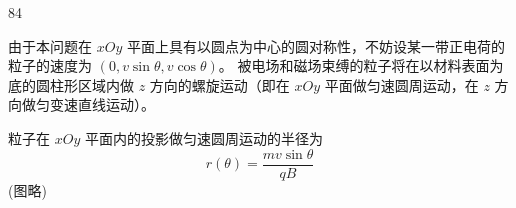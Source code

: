 \begin{solution}{84}
    \begin{subsolution}
        \begin{subsubsolution}
            由于本问题在 $xOy$ 平面上具有以圆点为中心的圆对称性，不妨设某一带正电荷的粒子的速度为
            $(0, v\sin\theta, v\cos\theta)$。
            被电场和磁场束缚的粒子将在以材料表面为底的圆柱形区域内做 $z$ 方向的螺旋运动（即在 $xOy$ 平面做匀速圆周运动，在 $z$ 方向做匀变速直线运动）。

            粒子在 $xOy$ 平面内的投影做匀速圆周运动的半径为
            \begin{equation}
                r(\theta) = \frac{m v \sin\theta}{q B}
                \label{eq:1.s84}
            \end{equation}
            (图略)


\end{subsubsolution}
\end{subsolution}
\end{solution}
